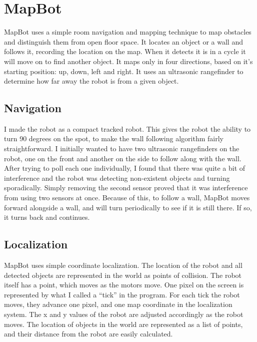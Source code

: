 \documentclass[12pt]{article}
\begin{document}

    \section{MapBot}
	MapBot uses a simple room navigation and mapping technique to map obstacles and distinguish them from open floor space. It locates an object or a wall and follows it, recording the location on the map. When it detects it is in a cycle it will move on to find another object. It maps only in four directions, based on it’s starting position: up, down, left and right. It uses an ultrasonic rangefinder to determine how far away the robot is from a given object.

	\subsection{Navigation}
I made the robot as a compact tracked robot. This gives the robot the ability to turn 90 degrees on the spot, to make the wall following algorithm fairly straightforward. I initially wanted to have two ultrasonic rangefinders on the robot, one on the front and another on the side to follow along with the wall. After trying to poll each one individually, I found that there was quite a bit of interference and the robot was detecting non-existent objects and turning sporadically. Simply removing the second sensor proved that it was interference from using two sensors at once. Because of this, to follow a wall, MapBot moves forward alongside a wall, and will turn periodically to see if it is still there. If so, it turns back and continues.

	\subsection{Localization}
MapBot uses simple coordinate localization. The location of the robot and all detected objects are represented in the world as points of collision. The robot itself has a point, which moves as the motors move. One pixel on the screen is represented by what I called a “tick” in the program. For each tick the robot moves, they advance one pixel, and one map coordinate in the localization system. The x and y values of the robot are adjusted accordingly as the robot moves. The location of objects in the world are represented as a list of points, and their distance from the robot are easily calculated.
\end{document}
